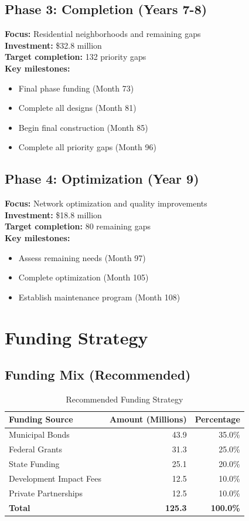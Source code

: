 \documentclass[11pt,letterpaper]{report}
\begin{document}
\subsection{Phase 3: Completion (Years 7-8)}
\textbf{Focus:} Residential neighborhoods and remaining gaps\\
\textbf{Investment:} \$32.8 million\\
\textbf{Target completion:} 132 priority gaps\\
\textbf{Key milestones:}
\begin{itemize}
    \item Final phase funding (Month 73)
    \item Complete all designs (Month 81)
    \item Begin final construction (Month 85)
    \item Complete all priority gaps (Month 96)
\end{itemize}

\subsection{Phase 4: Optimization (Year 9)}
\textbf{Focus:} Network optimization and quality improvements\\
\textbf{Investment:} \$18.8 million\\
\textbf{Target completion:} 80 remaining gaps\\
\textbf{Key milestones:}
\begin{itemize}
    \item Assess remaining needs (Month 97)
    \item Complete optimization (Month 105)
    \item Establish maintenance program (Month 108)
\end{itemize}

\section{Funding Strategy}

\subsection{Funding Mix (Recommended)}
\begin{table}[h]
\centering
\caption{Recommended Funding Strategy}
\begin{tabular}{lrr}
\toprule
\textbf{Funding Source} & \textbf{Amount (Millions)} & \textbf{Percentage} \\
\midrule
Municipal Bonds & 43.9 & 35.0\% \\
Federal Grants & 31.3 & 25.0\% \\
State Funding & 25.1 & 20.0\% \\
Development Impact Fees & 12.5 & 10.0\% \\
Private Partnerships & 12.5 & 10.0\% \\
\textbf{Total} & \textbf{125.3} & \textbf{100.0\%} \\
\bottomrule
\end{tabular}
\end{table}
\end{document}
